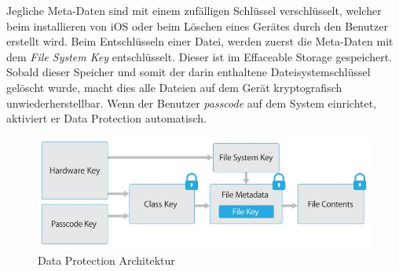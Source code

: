 		Jegliche Meta-Daten sind mit einem zufälligen Schlüssel verschlüsselt, welcher
		beim installieren von iOS oder beim Löschen eines Gerätes durch den Benutzer
		erstellt wird. Beim Entschlüsseln einer Datei, werden zuerst die Meta-Daten
		mit dem \textsl{File System Key} entschlüsselt. Dieser ist im Effaceable Storage
		gespeichert.
		Sobald dieser Speicher und somit der darin enthaltene Dateisystemschlüssel
		gelöscht wurde, macht dies alle Dateien auf dem Gerät kryptografisch
		unwiederherstellbar. Wenn der Benutzer \textsl{passcode} auf dem System
		einrichtet, aktiviert er Data Protection automatisch.
		\begin{figure}[h]
			\centering
			\includegraphics[width=0.9\linewidth]{ios/media/data-protection.jpg}
			\caption{Data Protection Architektur 
			\cite[S. 10]{iOSSecurityApr2015}}
			\label{fig:data-protection}
		\end{figure}
